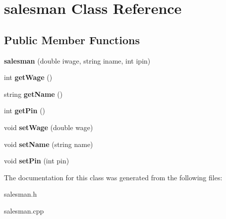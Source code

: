 \hypertarget{classsalesman}{}\section{salesman Class Reference}
\label{classsalesman}
\subsection*{Public Member Functions}
\begin{DoxyCompactItemize}
\item 
{\bfseries salesman} (double iwage, string iname, int ipin)\hypertarget{classsalesman_aae090e397885ba99363617d6e9f88e5b}{}\label{classsalesman_aae090e397885ba99363617d6e9f88e5b}

\item 
int {\bfseries get\+Wage} ()\hypertarget{classsalesman_a06e188c92535654b9641f48b298843ec}{}\label{classsalesman_a06e188c92535654b9641f48b298843ec}

\item 
string {\bfseries get\+Name} ()\hypertarget{classsalesman_a175554e3d78c71a635c00453817afdb8}{}\label{classsalesman_a175554e3d78c71a635c00453817afdb8}

\item 
int {\bfseries get\+Pin} ()\hypertarget{classsalesman_a5f8b1958d3f539125d7d2f42c400e055}{}\label{classsalesman_a5f8b1958d3f539125d7d2f42c400e055}

\item 
void {\bfseries set\+Wage} (double wage)\hypertarget{classsalesman_ad304b047a727b173664a2a4ba0c9428c}{}\label{classsalesman_ad304b047a727b173664a2a4ba0c9428c}

\item 
void {\bfseries set\+Name} (string name)\hypertarget{classsalesman_ae09fb675f86c168a6e7b09c948543c9c}{}\label{classsalesman_ae09fb675f86c168a6e7b09c948543c9c}

\item 
void {\bfseries set\+Pin} (int pin)\hypertarget{classsalesman_a5bc5c4df43197e26c0cc883352983191}{}\label{classsalesman_a5bc5c4df43197e26c0cc883352983191}

\end{DoxyCompactItemize}


The documentation for this class was generated from the following files\+:\begin{DoxyCompactItemize}
\item 
salesman.\+h\item 
salesman.\+cpp\end{DoxyCompactItemize}
